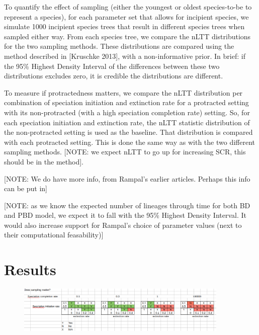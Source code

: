 \documentclass{article}
\begin{document}
To quantify the effect of sampling (either the youngest or oldest species-to-be to represent
a species), for each parameter set that allows for incipient species,
we simulate 1000 incipient species trees that result in different species trees
when sampled either way. From each species tree, we compare the nLTT distributions
for the two sampling methods. These distributions are compared 
using the method described in [Kruschke 2013], with a non-informative
prior. In brief: if the 95\% Highest Density Interval of the differences between 
these two distributions excludes zero, it is credible the distributions are different. 

To measure if protractedness matters, we compare the nLTT distribution per
combination of speciation initiation and extinction rate for a protracted
setting with its non-protracted (with a high speciation completion 
rate) setting. So, for each speciation initiation and extinction rate, 
the nLTT statistic distribution of the 
non-protracted setting is used as the baseline. That distribution is compared
with each protracted setting. This is done the same way as with the two
different sampling methods. [NOTE: we expect nLTT to go up for increasing SCR,
this should be in the method].

[NOTE: We do have more info, from Rampal's earlier articles. Perhaps this 
info can be put in]

[NOTE: as we know the expected number of lineages through time for both BD and PBD
model, we expect it to fall with the 95\% Highest Density Interval. It would also
increase support for Rampal's choice of parameter values (next to their 
computational feasability)]

\section{Results}

\begin{figure}[]
  \includegraphics[width=0.9\textwidth]{fig_does_sampling_matter.png}
\end{figure}
\end{document}
